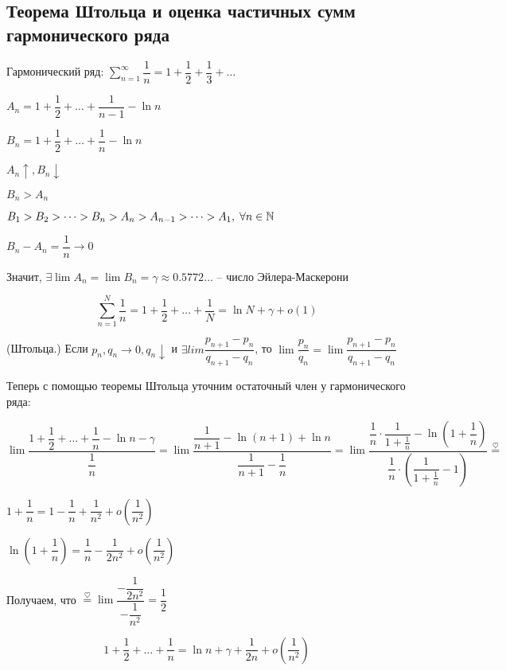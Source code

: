 \subsection{Теорема Штольца и оценка частичных сумм гармонического ряда}

Гармонический ряд: $\sum_{n=1}^{\infty} \dfrac{1}{n} = 1 + \dfrac{1}{2} + \dfrac{1}{3} + \dots$

$A_n = 1 + \dfrac{1}{2} + \dots + \dfrac{1}{n - 1} - \ln n$

$B_n = 1 + \dfrac{1}{2} + \dots + \dfrac{1}{n} - \ln n$

$A_n \uparrow, B_n \downarrow$

$B_n > A_n$

$B_1 > B_2 > \dots > B_n > A_n > A_{n-1} > \dots > A_1,\; \forall n \in \mathbb{N}$

$B_n - A_n = \dfrac{1}{n} \to 0$ 

Значит, $\exists \lim A_n = \lim B_n = \gamma \approx 0.5772\dots$ -- число Эйлера-Маскерони

$$ \sum_{n=1}^{N} \dfrac{1}{n} = 1 + \dfrac{1}{2} + \dots + \dfrac{1}{N} = \ln N + \gamma + o(1) $$

\begin{theorem}
(Штольца.) Если $p_n, q_n \to 0, q_n \downarrow$ и $\exists lim \dfrac{p_{n + 1} - p_n}{q_{n + 1} - q_n}$, то
$\lim \dfrac{p_n}{q_n} = \lim \dfrac{p_{n + 1} - p_n}{q_{n + 1} - q_n}$
\end{theorem}

Теперь с помощью теоремы Штольца уточним остаточный член у гармонического ряда:

$\lim \dfrac{1 + \dfrac{1}{2} + \dots + \dfrac{1}{n} - \ln n - \gamma}{\dfrac{1}{n}} = \lim \dfrac{\dfrac{1}{n + 1} - \ln(n + 1) + \ln n}{\dfrac{1}{n + 1} - \dfrac{1}{n}} =
\lim \dfrac{\dfrac{1}{n} \cdot \dfrac{1}{1 + \frac{1}{n}} - \ln{\left(1 + \dfrac{1}{n}\right)}}{\dfrac{1}{n} \cdot \left(\dfrac{1}{1 + \frac{1}{n}} - 1\right)} \overset{\heartsuit}{=}$

$1 + \dfrac{1}{n} = 1 - \dfrac{1}{n} + \dfrac{1}{n^2} + o\left(\dfrac{1}{n^2}\right)$

$\ln\left(1 + \dfrac{1}{n}\right) = \dfrac{1}{n} - \dfrac{1}{2n^2} + o\left(\dfrac{1}{n^2}\right)$

Получаем, что $\overset{\heartsuit}{=} \lim \dfrac{-\dfrac{1}{2n^2}}{-\dfrac{1}{n^2}} = \dfrac{1}{2}$

$$ 1 + \dfrac{1}{2} + \dots + \dfrac{1}{n} = \ln n + \gamma + \dfrac{1}{2n} + o\left(\dfrac{1}{n^2}\right) $$

